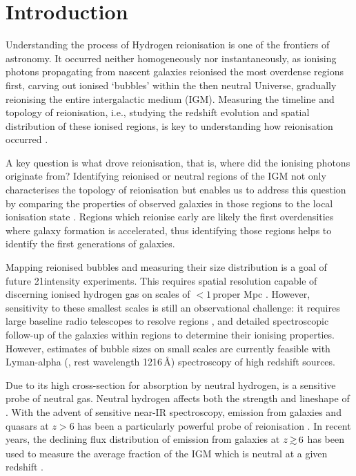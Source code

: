 \documentclass[fleqn,usenatbib]{mnras}
\begin{document}


\section{Introduction}
\label{sec:intro}

Understanding the process of Hydrogen reionisation is one of the frontiers of astronomy. 
It occurred neither homogeneously nor instantaneously, as ionising photons propagating from nascent galaxies reionised the most overdense regions first, carving out ionised `bubbles' within the then neutral Universe, gradually reionising the entire intergalactic medium (IGM). Measuring the timeline and topology of reionisation, i.e., studying the redshift evolution and spatial distribution of these ionised regions, is key to understanding how reionisation occurred \citep[e.g.,][]{Furlanetto2004a,McQuinn2007,Mesinger2016a}.

A key question is what drove reionisation, that is, where did the ionising photons originate from?
Identifying reionised or neutral regions of the IGM not only characterises the topology of reionisation but enables us to address this question by comparing the properties of observed galaxies in those regions to the local ionisation state \citep[e.g.,][]{Beardsley2015a}. Regions which reionise early are likely the first overdensities where galaxy formation is accelerated, thus identifying those regions helps to identify the first generations of galaxies.

Mapping reionised bubbles and measuring their size distribution is a goal of future 21\cm intensity experiments. This requires spatial resolution capable of discerning ionised hydrogen gas on scales of $<1$\,proper Mpc \citep[e.g.,][]{Geil2017}. However, sensitivity to these smallest scales is still an observational challenge: it requires large baseline radio telescopes to resolve \HI regions \citep[e.g., SKA-low,][]{Koopmans2015}, and detailed spectroscopic follow-up of the galaxies within \HII regions to determine their ionising properties. However, estimates of bubble sizes on small scales are currently feasible with Lyman-alpha (\lya, rest wavelength 1216\,\AA) spectroscopy of high redshift sources.

Due to its high cross-section for absorption by neutral hydrogen, \lya is a sensitive probe of neutral gas. Neutral hydrogen affects both the strength and lineshape of \lya \citep[see, e.g.,][for a review]{Dijkstra2014}. With the advent of sensitive near-IR spectroscopy, \lya emission from galaxies and quasars at $z>6$ has been a particularly powerful probe of reionisation \citep[e.g.,][]{Malhotra2006,Fan2006,Dijkstra2011,Treu2013,Mesinger2015,Davies2018b,Mason2018,Greig2019}. In recent years, the declining flux distribution of \lya emission from galaxies at $z\simgt6$ has been used to measure the average fraction of the IGM which is neutral at a given redshift \citep{Schenker2014,Mason2018,Mason2019a,Hoag2019a,Whitler2019}.
\end{document}
